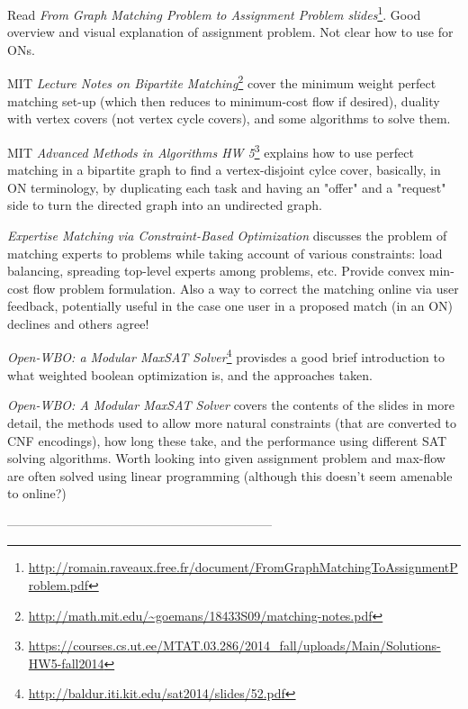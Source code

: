\documentclass[
11pt, %
a4paper, %
oneside, %
headinclude,footinclude, %
BCOR5mm, %
]{scrartcl}
\begin{document}
Read \textit{From Graph Matching Problem to Assignment Problem slides}\footnote{ \url{http://romain.raveaux.free.fr/document/FromGraphMatchingToAssignmentProblem.pdf}}. Good overview and visual explanation of assignment problem. Not clear how to use for ONs.

MIT \textit{Lecture Notes on Bipartite Matching}\footnote{\url{http://math.mit.edu/~goemans/18433S09/matching-notes.pdf}} cover the minimum weight perfect matching set-up (which then reduces to minimum-cost flow if desired), duality with vertex covers (not vertex cycle covers), and some algorithms to solve them.

MIT \textit{Advanced Methods in Algorithms HW 5}\footnote{\url{https://courses.cs.ut.ee/MTAT.03.286/2014_fall/uploads/Main/Solutions-HW5-fall2014}} explains how to use perfect matching in a bipartite graph to find a vertex-disjoint cylce cover, basically, in ON terminology, by duplicating each task and having an "offer" and a "request" side to turn the directed graph into an undirected graph.

\textit{Expertise Matching via Constraint-Based Optimization} \cite{Tan1} discusses the problem of matching experts to problems while taking account of various constraints: load balancing, spreading top-level experts among problems, etc. Provide convex min-cost flow problem formulation. Also a way to correct the matching online via user feedback, potentially useful in the case one user in a proposed match (in an ON) declines and others agree!

\textit{Open-WBO: a Modular MaxSAT Solver}\footnote{\url{http://baldur.iti.kit.edu/sat2014/slides/52.pdf}} provisdes a good brief introduction to what weighted boolean optimization is, and the approaches taken.

\textit{Open-WBO: A Modular MaxSAT Solver} \cite{Mar1} covers the contents of the slides in more detail, the methods used to allow more natural constraints (that are converted to CNF encodings), how long these take, and the performance using different SAT solving algorithms. Worth looking into given assignment problem and max-flow are often solved using linear programming (although this doesn't seem amenable to online?)

---------------------------------------------------------------

\renewcommand{\refname}{\spacedlowsmallcaps{References}} %




\end{document}
